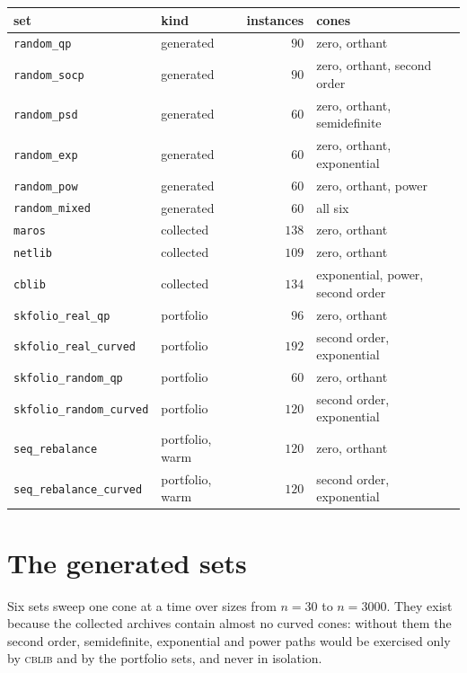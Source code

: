 \documentclass[a4paper,11pt]{book}
\theoremstyle{plain}
\theoremstyle{definition}
\theoremstyle{remark}
\numberwithin{equation}{chapter}
\numberwithin{algorithm}{chapter}
\begin{document}
	\begin{table}[H]
		\centering\small
		\begin{tabular}{llrl}
			\toprule
			set & kind & instances & cones\\
			\midrule
			\texttt{random\_qp} & generated & $90$ & zero, orthant\\
			\texttt{random\_socp} & generated & $90$ & zero, orthant, second order\\
			\texttt{random\_psd} & generated & $60$ & zero, orthant, semidefinite\\
			\texttt{random\_exp} & generated & $60$ & zero, orthant, exponential\\
			\texttt{random\_pow} & generated & $60$ & zero, orthant, power\\
			\texttt{random\_mixed} & generated & $60$ & all six\\
			\midrule
			\texttt{maros} & collected & $138$ & zero, orthant\\
			\texttt{netlib} & collected & $109$ & zero, orthant\\
			\texttt{cblib} & collected & $134$ & exponential, power, second order\\
			\midrule
			\texttt{skfolio\_real\_qp} & portfolio & $96$ & zero, orthant\\
			\texttt{skfolio\_real\_curved} & portfolio & $192$ & second order,
			exponential\\
			\texttt{skfolio\_random\_qp} & portfolio & $60$ & zero, orthant\\
			\texttt{skfolio\_random\_curved} & portfolio & $120$ & second order,
			exponential\\
			\texttt{seq\_rebalance} & portfolio, warm & $120$ & zero, orthant\\
			\texttt{seq\_rebalance\_curved} & portfolio, warm & $120$ & second
			order, exponential\\
			\bottomrule
		\end{tabular}
	\end{table}

	\section{The generated sets}

	Six sets sweep one cone at a time over sizes from $n=30$ to $n=3000$. They
	exist because the collected archives contain almost no curved cones: without
	them the second order, semidefinite, exponential and power paths would be
	exercised only by \textsc{cblib} and by the portfolio sets, and never in
	isolation.
\end{document}
